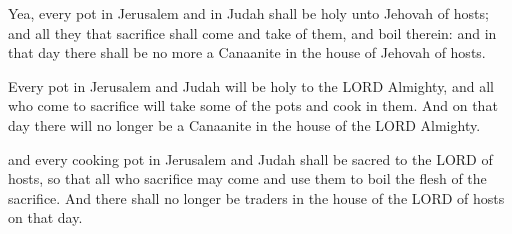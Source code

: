 			\begin{versebox}
					\item[BHS] 
					\item[LXX] 
					\item[ASV] Yea, every pot in Jerusalem and in Judah shall be holy unto Jehovah of hosts; and all they that sacrifice shall come and take of them, and boil therein: and in that day there shall be no more a Canaanite in the house of Jehovah of hosts.
					\item[NIV] Every pot in Jerusalem and Judah will be holy to the LORD Almighty, and all who come to sacrifice will take some of the pots and cook in them. And on that day there will no longer be a Canaanite in the house of the LORD Almighty.
					\item[NRSV] and every cooking pot in Jerusalem and Judah shall be sacred to the LORD of hosts, so that all who sacrifice may come and use them to boil the flesh of the sacrifice. And there shall no longer be traders in the house of the LORD of hosts on that day.
			\end{versebox}
